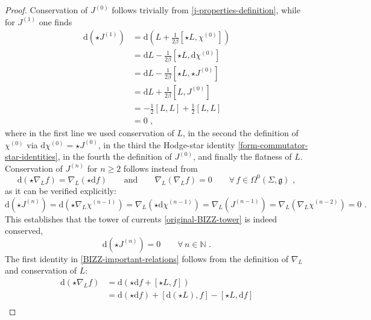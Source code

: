 \documentclass[12pt]{article}
\numberwithin{equation}{section}
\begin{document}
\begin{proof}
Conservation of $J^{(0)}$ follows trivially from \eqref{j-properties-definition}, while for $J^{(1)}$ one finds
\begin{equation}
\begin{aligned}
\mathrm{d}(\star J^{(1)})&=\mathrm{d}(L+\tfrac{1}{2\beta}[\star L,\chi^{(0)}])
\\
&=\mathrm{d}L-\tfrac{1}{2\beta}[\star L, \mathrm{d}\chi^{(0)}]
\\
&=\mathrm{d}L-\tfrac{1}{2\beta}[\star L,\star J^{(0)}]
\\
&=\mathrm{d}L+\tfrac{1}{2\beta}[ L, J^{(0)}]
\\
&=-\tfrac{1}{2}[L,L]+\tfrac{1}{2}[L,L]
\\
&=0 \,\, ,
\end{aligned}
\end{equation}
where in the first line we used conservation of $L$, in the second the definition of $\chi^{(0)}$ via $\mathrm{d}\chi^{(0)}=\star J^{(0)}$, in the third the Hodge-star identity \eqref{form-commutator-star-identities}, in the fourth the definition of $J^{(0)}$, and finally the flatness of $L$.
Conservation of $J^{(n)}$ for $n\geq 2$ follows instead from
\begin{equation}\label{BIZZ-important-relations}
\mathrm{d}(\star \nabla_{L}f)=\nabla_{L}(\star \mathrm{d}f)
\qquad \text{and} \qquad 
\nabla_{L}(\nabla_{L}f)=0 \qquad \forall \, f\in \Omega^{0}(\Sigma,\mathfrak{g}) \,\, ,
\end{equation}
as it can be verified explicitly:
\begin{equation}
\mathrm{d}(\star J^{(n)})=\mathrm{d}(\star \nabla_{L}\chi^{(n-1)})=\nabla_{L}(\star \mathrm{d}\chi^{(n-1)})=\nabla_{L}(J^{(n-1)})=\nabla_{L}(\nabla_{L}\chi^{(n-2)})=0 \,\, .
\end{equation}
This establishes that the tower of currents \eqref{original-BIZZ-tower} is indeed conserved,
\begin{equation}
\mathrm{d}(\star J^{(n)})=0 \qquad \forall \, n\in \mathbb{N} \,\, .
\end{equation}
The first identity in \eqref{BIZZ-important-relations} follows from the definition of $\nabla_{L}$ and conservation of $L$:
\begin{equation}
\begin{aligned}
\mathrm{d}(\star \nabla_{L}f)&=\mathrm{d}(\star \mathrm{d}f+[\star L,f])
\\
&=\mathrm{d}(\star \mathrm{d}f)+[\mathrm{d}(\star L),f]-[\star L,\mathrm{d}f]
\\

\end{aligned}
\end{equation}
\end{proof}
\end{document}
